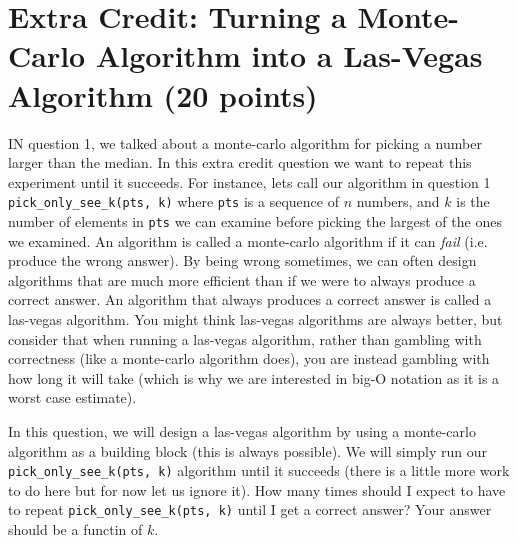 \documentclass[11pt]{article}
\newcommand{\question}[1]{\section*{\normalsize #1}}
\begin{document}
\question{Extra Credit: Turning a Monte-Carlo Algorithm into a Las-Vegas Algorithm (20 points)}
IN question 1, we talked about a monte-carlo algorithm for picking a number larger than the median. In this extra credit question we want to repeat this experiment until it succeeds. For instance, lets call our algorithm in question 1 \texttt{pick\_only\_see\_k(pts, k)} where \texttt{pts} is a sequence of $n$ numbers, and $k$ is the number of elements in \texttt{pts} we can examine before picking the largest of the ones we examined. An algorithm is called a monte-carlo algorithm if it can \textit{fail} (i.e. produce the wrong answer). By being wrong sometimes, we can often design algorithms that are much more efficient than if we were to always produce a correct answer. An algorithm that always produces a correct answer is called a las-vegas algorithm. You might think las-vegas algorithms are always better, but consider that when running a las-vegas algorithm, rather than gambling with correctness (like a monte-carlo algorithm does), you are instead gambling with how long it will take (which is why we are interested in big-O notation as it is a worst case estimate).\newline

\noindent In this question, we will design a las-vegas algorithm by using a monte-carlo algorithm as a building block (this is always possible). We will simply run our \texttt{pick\_only\_see\_k(pts, k)} algorithm until it succeeds (there is a little more work to do here but for now let us ignore it). How many times should I expect to have to repeat \texttt{pick\_only\_see\_k(pts, k)} until I get a correct answer? Your answer should be a functin of $k$.
\end{document}
